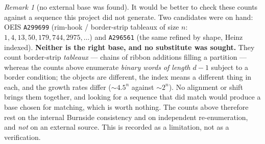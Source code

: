\documentclass[11pt]{article}
\theoremstyle{definition}
\theoremstyle{remark}
\newtheorem{remark}[theorem]{Remark}
\begin{document}
\begin{remark}[no external base was found]\label{rem:oeis}
It would be better to check these counts against a sequence this project did not generate.
Two candidates were on hand: OEIS \texttt{A299699} (rim-hook / border-strip tableaux of size
$n$: $1,4,13,50,179,744,2975,\dots$) and \texttt{A296561} (the same refined by shape, Heinz
indexed).  \textbf{Neither is the right base, and no substitute was sought.}  They count
border-strip \emph{tableaux} --- chains of ribbon additions filling a partition --- whereas the
counts above enumerate \emph{binary words of length $d-1$} subject to a border condition; the
objects are different, the index means a different thing in each, and the growth rates differ
($\sim4.5^{n}$ against $\sim2^{n}$).  No alignment or shift brings them together, and looking
for a sequence that did match would produce a base chosen for matching, which is worth nothing.
The counts above therefore rest on the internal Burnside consistency and on independent
re-enumeration, and \emph{not} on an external source.  This is recorded as a limitation, not as
a verification.
\end{remark}
\end{document}
